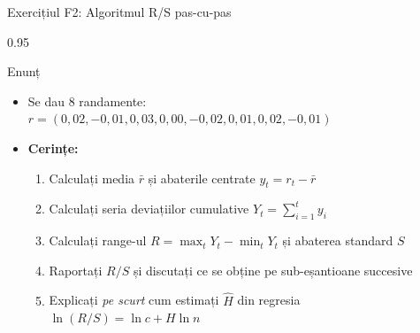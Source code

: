 \documentclass[9pt, aspectratio=169, t]{beamer}
\begin{document}
\begin{frame}[shrink=25]{Exercițiul F2: Algoritmul R/S pas-cu-pas}
\begin{cminipage}{0.95\textwidth}
\begin{block}{Enunț}
\begin{itemize}\setlength{\itemsep}{0pt}
    \item Se dau 8 randamente: $r = (0{,}02, -0{,}01, 0{,}03, 0{,}00, -0{,}02, 0{,}01, 0{,}02, -0{,}01)$
    \item \textbf{Cerințe:}
    \begin{enumerate}\setlength{\itemsep}{0pt}
        \item Calculați media $\bar r$ și abaterile centrate $y_t = r_t - \bar r$
        \item Calculați seria deviațiilor cumulative $Y_t = \sum_{i=1}^t y_i$
        \item Calculați range-ul $R = \max_t Y_t - \min_t Y_t$ și abaterea standard $S$
        \item Raportați $R/S$ și discutați ce se obține pe sub-eșantioane succesive
        \item Explicați \emph{pe scurt} cum estimați $\hat H$ din regresia $\ln(R/S) = \ln c + H \ln n$
    \end{enumerate}
\end{itemize}
\end{block}
\end{cminipage}
\end{frame}
\end{document}
